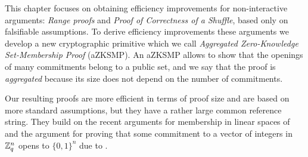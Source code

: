 This chapter focuses on obtaining efficiency improvements for non-interactive arguments: \emph{Range proofs} and \emph{Proof of Correctness of a Shuffle}, based only on falsifiable assumptions.  To derive efficiency improvements these arguments we develop a new cryptographic primitive which we call \emph{Aggregated Zero-Knowledge Set-Membership Proof} (aZKSMP). An aZKSMP allows to show that the openings of many commitments belong to a public set, and we say that the proof is \emph{aggregated} because its size does not depend on the number of commitments.

Our resulting proofs are more efficient in terms of proof size and are based on more standard assumptions, but they have a rather large common reference string. They build on the recent arguments for membership in linear spaces of \cite{EC:LPJY14,C:JutRoy14,EC:KilWee15} and the argument for proving that some commitment to a vector of integers in $\mathbb{Z}_q^{n}$ opens to $\{0,1\}^n$ due to \cite{AC:GonHevRaf15}. 
 

